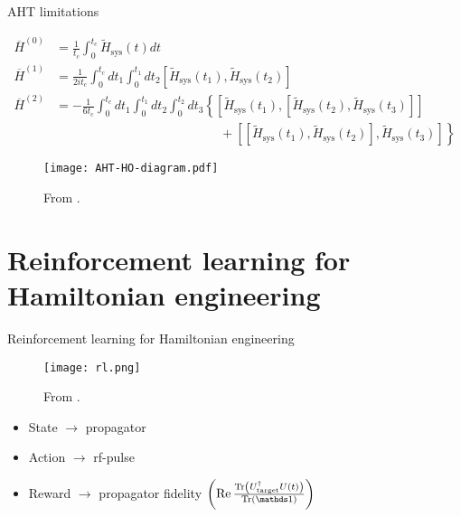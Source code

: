 \documentclass{beamer}
\begin{document}
\begin{frame}{AHT limitations}

{\scriptsize %
\begin{align*}
    \overline{H}^{(0)} &= \frac{1}{t_c} \int_0^{t_c}
        \widetilde{H}_{\text{sys}}(t) dt \\
    \overline{H}^{(1)} &= \frac{1}{2it_c} \int_0^{t_c} dt_1 \int_0^{t_1} dt_2
        \left[\widetilde{H}_{\text{sys}}(t_1), \widetilde{H}_{\text{sys}}(t_2)\right] \\
    \overline{H}^{(2)} &= -\frac{1}{6t_c}
    \int_0^{t_c} dt_1 \int_0^{t_1} dt_2 \int_0^{t_2} dt_3
    \left\{
    \left[\widetilde{H}_{\text{sys}}(t_1), \left[\widetilde{H}_{\text{sys}}(t_2), \widetilde{H}_{\text{sys}}(t_3)\right]\right] \right. \\
    & \hspace{13em} + \left.
    \left[\left[\widetilde{H}_{\text{sys}}(t_1), \widetilde{H}_{\text{sys}}(t_2)\right], \widetilde{H}_{\text{sys}}(t_3)\right]
    \right\}
\end{align*}
}
\vspace{-1em}
\begin{figure}
\centering
\texttt{[image: AHT-HO-diagram.pdf]}

{\scriptsize From \cite{brinkmann_2016}.}
\end{figure}



\end{frame}



\section{Reinforcement learning for Hamiltonian engineering}

\begin{frame}{Reinforcement learning for Hamiltonian engineering}

\begin{figure}
\centering
\texttt{[image: rl.png]}

From \cite{sutton2018reinforcement}.
\end{figure}

\begin{itemize}
    \item State $\to$ propagator
    \item Action $\to$ rf-pulse
    \item Reward $\to$ propagator fidelity $\left(\Re{
        \frac{\Tr{U_\text{target}^\dagger U(t)}}{\Tr{\identity}}
    }\right)$
\end{itemize}

\end{frame}
\end{document}
